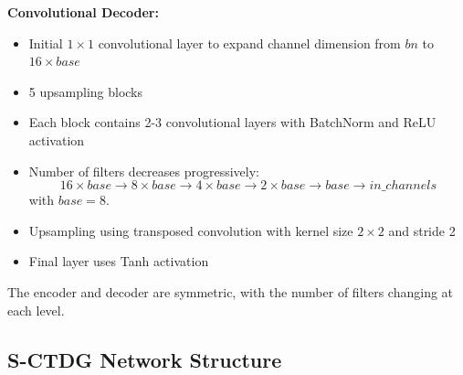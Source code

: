 \textbf{Convolutional Decoder:}
\begin{itemize}
    \item Initial $1\times 1$ convolutional layer 
    to expand channel dimension from $bn$ to $16 \times base$
    \item 5 upsampling blocks
    \item Each block contains 2-3 convolutional
    layers with BatchNorm and ReLU activation
    \item Number of filters decreases progressively:
    $$ 16\times base \rightarrow 8
    \times base \rightarrow 4\times base \rightarrow
    2\times base \rightarrow base \rightarrow in\_channels$$
    with $base = 8$.
    \item Upsampling using transposed convolution
     with kernel size $2\times 2$ and stride 2
    \item Final layer uses Tanh activation
\end{itemize}
The encoder and decoder are symmetric, with the number of filters changing at each level.

\subsection{S-CTDG Network Structure}

